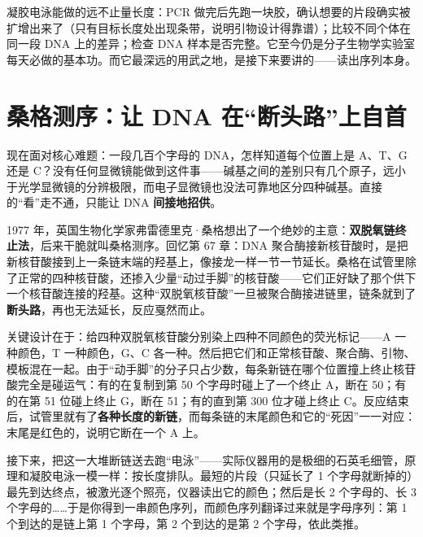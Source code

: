 凝胶电泳能做的远不止量长度：PCR 做完后先跑一块胶，确认想要的片段确实被扩增出来了（只有目标长度处出现条带，说明引物设计得靠谱）；比较不同个体在同一段 DNA 上的差异；检查 DNA 样本是否完整。它至今仍是分子生物学实验室每天必做的基本功。而它最深远的用武之地，是接下来要讲的——读出序列本身。

\section{桑格测序：让 DNA 在“断头路”上自首}

现在面对核心难题：一段几百个字母的 DNA，怎样知道每个位置上是 A、T、G 还是 C？没有任何显微镜能做到这件事——碱基之间的差别只有几个原子，远小于光学显微镜的分辨极限，而电子显微镜也没法可靠地区分四种碱基。直接的“看”走不通，只能让 DNA \textbf{间接地招供}。

1977 年，英国生物化学家弗雷德里克·桑格想出了一个绝妙的主意：\textbf{双脱氧链终止法}，后来干脆就叫桑格测序。回忆第 67 章：DNA 聚合酶接新核苷酸时，是把新核苷酸接到上一条链末端的羟基上，像接龙一样一节一节延长。桑格在试管里除了正常的四种核苷酸，还掺入少量“动过手脚”的核苷酸——它们正好缺了那个供下一个核苷酸连接的羟基。这种“双脱氧核苷酸”一旦被聚合酶接进链里，链条就到了\textbf{断头路}，再也无法延长，反应戛然而止。

关键设计在于：给四种双脱氧核苷酸分别染上四种不同颜色的荧光标记——A 一种颜色，T 一种颜色，G、C 各一种。然后把它们和正常核苷酸、聚合酶、引物、模板混在一起。由于“动手脚”的分子只占少数，每条新链在哪个位置撞上终止核苷酸完全是碰运气：有的在复制到第 50 个字母时碰上了一个终止 A，断在 50；有的在第 51 位碰上终止 G，断在 51；有的直到第 300 位才碰上终止 C。反应结束后，试管里就有了\textbf{各种长度的新链}，而每条链的末尾颜色和它的“死因”一一对应：末尾是红色的，说明它断在一个 A 上。

接下来，把这一大堆断链送去跑“电泳”——实际仪器用的是极细的石英毛细管，原理和凝胶电泳一模一样：按长度排队。最短的片段（只延长了 1 个字母就断掉的）最先到达终点，被激光逐个照亮，仪器读出它的颜色；然后是长 2 个字母的、长 3 个字母的……于是你得到一串颜色序列，而颜色序列翻译过来就是字母序列：第 1 个到达的是链上第 1 个字母，第 2 个到达的是第 2 个字母，依此类推。

